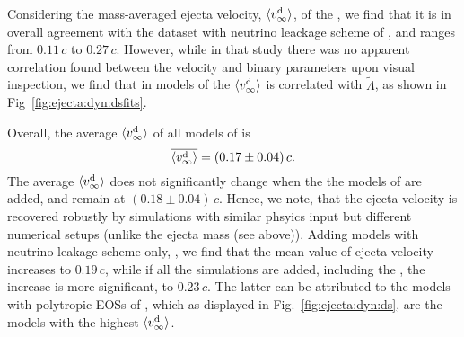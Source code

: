Considering the mass-averaged ejecta velocity, $\langle v^{\text{d}}_\infty\rangle$, of the \DSrefset{}, we 
find that it is in overall agreement with the dataset with neutrino leackage scheme 
of \citet{Radice:2018pdn}, and ranges from $0.11\, c$ to $0.27\, c$. However, while in 
that study there was no apparent correlation found between the velocity and binary 
parameters upon visual inspection, we find that in models of \DSrefset{} the $\langle v^{\text{d}}_\infty\rangle$ 
is correlated with $\tilde{\Lambda}$, as shown in Fig~\ref{fig:ejecta:dyn:dsfits}.
%

Overall, the average $\langle v^{\text{d}}_\infty\rangle$ of all models of \DSrefset{} is 
%
\begin{equation}
\label{eq:ejecta:dyn:avg:v}
\overline{\langle v^{\text{d}}_\infty\rangle} = (0.17\pm0.04)\,c . 
\end{equation}
%
The average $\langle v^{\text{d}}_\infty\rangle$ does not significantly change when the the models of \DSheatcool{} 
are added, and remain at $(0.18 \pm 0.04) \, c$.
Hence, we note, that the ejecta velocity is recovered robustly by simulations with 
similar phsyics input but different numerical setups (unlike the ejecta mass (see above)).
%
Adding models with neutrino leakage scheme only, \DScool{}, we find that the mean value of ejecta velocity increases to $0.19\, c$, while if all the simulations are added, including the \DSnone{}, 
the increase is more significant, to $0.23\, c$. The latter can be attributed to the models 
with polytropic \acp{EOS} of \citet{Bauswein:2013yna}, which as
displayed in Fig.~\ref{fig:ejecta:dyn:ds}, are the models with 
the highest $\langle v^{\text{d}}_\infty\rangle$.


